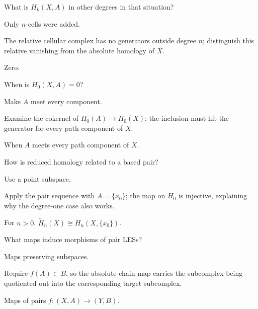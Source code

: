 \begin{exercise}\label{exr:viii19-19}
What is \(H_k(X,A)\) in other degrees in that situation?
\end{exercise}
\begin{hint}
Only \(n\)-cells were added.

The relative cellular complex has no generators outside degree \(n\); distinguish this relative vanishing from the absolute homology of \(X\).
\end{hint}
\begin{solution}
Zero.
\end{solution}

\begin{exercise}\label{exr:viii19-20}
When is \(H_0(X,A)=0\)?
\end{exercise}
\begin{hint}
Make \(A\) meet every component.

Examine the cokernel of \(H_0(A)\to H_0(X)\); the inclusion must hit the generator for every path component of \(X\).
\end{hint}
\begin{solution}
When \(A\) meets every path component of \(X\).
\end{solution}

\begin{exercise}\label{exr:viii19-21}
How is reduced homology related to a based pair?
\end{exercise}
\begin{hint}
Use a point subspace.

Apply the pair sequence with \(A=\{x_0\}\); the map on \(H_0\) is injective, explaining why the degree-one case also works.
\end{hint}
\begin{solution}
For \(n>0\), \(\widetilde H_n(X)\cong H_n(X,\{x_0\})\).
\end{solution}

\begin{exercise}\label{exr:viii19-22}
What maps induce morphisms of pair LESs?
\end{exercise}
\begin{hint}
Maps preserving subspaces.

Require \(f(A)\subset B\), so the absolute chain map carries the subcomplex being quotiented out into the corresponding target subcomplex.
\end{hint}
\begin{solution}
Maps of pairs \(f:(X,A)\to(Y,B)\).
\end{solution}


